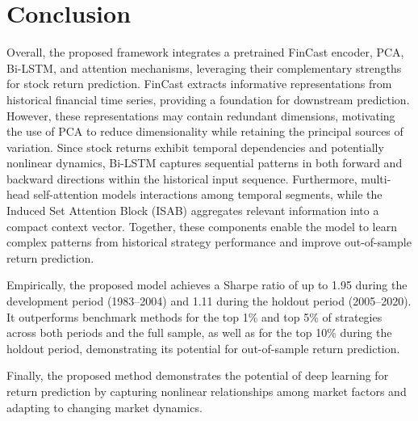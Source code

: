 \documentclass[pdflatex,sn-mathphys-num]{sn-jnl}%
\theoremstyle{thmstyleone}%
\theoremstyle{thmstyletwo}%
\theoremstyle{thmstylethree}%
\begin{document}
\section{Conclusion}\label{sec6}
Overall, the proposed framework integrates a pretrained FinCast encoder, PCA, Bi-LSTM, and attention mechanisms, leveraging their complementary strengths for stock return prediction. FinCast extracts informative representations from historical financial time series, providing a foundation for downstream prediction. However, these representations may contain redundant dimensions, motivating the use of PCA to reduce dimensionality while retaining the principal sources of variation. Since stock returns exhibit temporal dependencies and potentially nonlinear dynamics, Bi-LSTM captures sequential patterns in both forward and backward directions within the historical input sequence. Furthermore, multi-head self-attention models interactions among temporal segments, while the Induced Set Attention Block (ISAB) aggregates relevant information into a compact context vector. Together, these components enable the model to learn complex patterns from historical strategy performance and improve out-of-sample return prediction.

Empirically, the proposed model achieves a Sharpe ratio of up to 1.95 during the development period (1983–2004) and 1.11 during the holdout period (2005–2020). It outperforms benchmark methods for the top 1\% and top 5\% of strategies across both periods and the full sample, as well as for the top 10\% during the holdout period, demonstrating its potential for out-of-sample return prediction. 

Finally, the proposed method demonstrates the potential of deep learning for return prediction by capturing nonlinear relationships among market factors and adapting to changing market dynamics.

\end{document}
